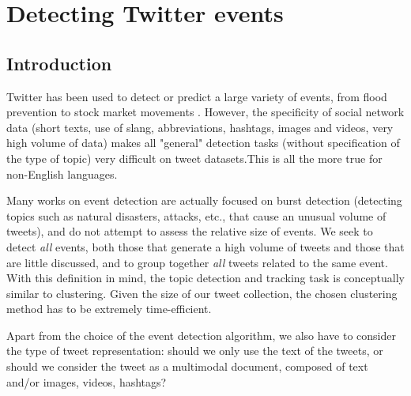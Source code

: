 \chapter{Detecting Twitter events}


\section{Introduction}
Twitter has been used to detect or predict a large variety of events,
from flood prevention \cite{de2017towards} to stock market movements
\cite{pagolu2016sentiment}. However, the specificity of social network data (short texts, use of
slang, abbreviations, hashtags, images and videos, very
high volume of data) makes all "general" detection tasks
(without specification
of the type of topic)
very difficult on tweet datasets.This is all the
more true for non-English languages.

Many works on event detection are actually
focused on burst detection (detecting topics such as
natural disasters, attacks, etc., that cause an unusual
volume of tweets), and do not attempt to assess the
relative size of events. We seek to detect \textit{all} events, both
those that generate a high volume of tweets and those that
are little discussed, and to group together \textit{all} tweets
related to the same event. With this definition in mind, the
topic detection and tracking task is conceptually similar to 
clustering. Given the size of our tweet collection, 
the chosen clustering method has to be extremely time-efficient.

Apart from the choice of the event detection algorithm, 
we also have to consider the type of tweet representation: 
should we only use the text of the tweets, or should we consider 
the tweet as a multimodal document, composed of text and/or images, videos, hashtags?

